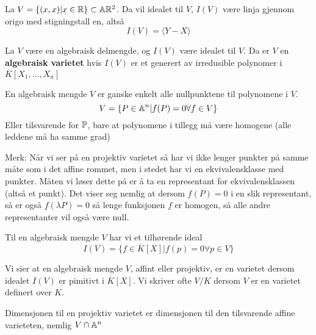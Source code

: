 \begin{eksempel}
La $V = \{(x,x) | x \in \mathbb{R} \} \subset \mathbb{A}{\mathbb{R}}^2$. Da vil idealet til $V$, $I(V)$ være linja gjennom origo med stigningstall en, altså $$I(V) = \langle  Y - X  \rangle $$

\end{eksempel}

\begin{definisjon}
La $V$ være en algebraisk delmengde, og $I(V)$ være idealet til $V$. Da er $V$ en \textbf{algebraisk varietet} hvis $I(V)$ er et generert av irredusible polynomer i $\overline{K}[X_1, \ldots, X_n]$
\end{definisjon}
\iffalse
\begin{definisjon}
En algebraisk mengde $V$ er ganske enkelt alle nullpunktene til polynomene i $V$. $$V = \{P \in \mathbb{A}^n | f(P) = 0 \forall f \in V \} $$ Eller tilsvarende for $\mathbb{P}$, bare at polynomene i tillegg må være homogene (alle leddene må ha samme grad)
\end{definisjon}
Merk: Når vi ser på en projektiv varietet så har vi ikke lenger punkter på samme måte som i det affine rommet, men i stedet har vi en ekvivalensklasse med punkter. Måten vi løser dette på er å ta en representant for ekvivalensklassen (altså et punkt). Det viser seg nemlig at dersom $f(P) = 0$ i en slik representant, så er også $ f(\lambda P) = 0$ så lenge funksjonen $f$ er homogen, så alle andre representanter vil også være null.

\begin{definisjon}
Til en algebraisk mengde $V$ har vi et tilhørende ideal $$ I(V)= \{f \in \overline{K}[X] | f(p) = 0 \forall p \in V\}$$
\end{definisjon}

\begin{definisjon}
Vi sier at en algebraisk mengde $V$, affint eller projektiv, er en varietet dersom idealet $I(V)$ er pimitivt i $\overline{K}[X]$. Vi skriver ofte $V/K$ dersom $V$ er en varietet definert over $K$.
\end{definisjon}

\endif

\begin{definisjon}
Dimensjonen til en projektiv varietet er dimensjonen til den tilsvarende affine varieteten, nemlig $V \cap \mathbb{A} ^n$
\end{definisjon}